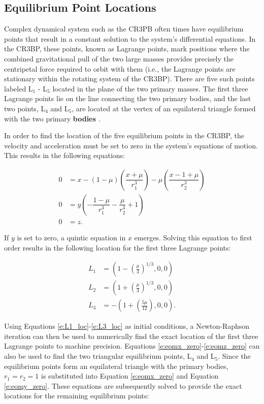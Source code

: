 \documentclass[11pt]{article} %
\begin{document}
\subsection{Equilibrium Point Locations}
Complex dynamical system such as the CR3PB often times have equilibrium points that result in a constant solution to the system's differential equations. In the CR3BP, these points, known as Lagrange points, mark positions where the combined gravitational pull of the two large masses provides precisely the centripetal force required to orbit with them (i.e., the Lagrange points are stationary within the rotating system of the CR3BP). There are five such points labeled L$_1$ - L$_5$ located in the plane of the two primary masses. The first three Lagrange points lie on the line connecting the two primary bodies, and the last two points, L$_4$ and L$_5$, are located at the vertex of an equilateral triangle formed with the two primary \textbf{bodies \cite{KoonLoMarsdenRoss2011}}.

In order to find the location of the five equilibrium points in the CR3BP, the velocity and acceleration must be set to zero in the system's equations of motion. This results in the following equations:

\begin{align}
	0 & = x - (1-\mu)\left(\dfrac{x+\mu}{r_1^3}\right) - \mu\left(\dfrac{x-1+\mu}{r_2^3}\right) \label{e:eomx_zero}\\
	0 & = y\left(-\dfrac{1-\mu}{r_1^3} - \dfrac{\mu}{r_2^3} + 1\right) \label{e:eomy_zero}\\
	0 & = z. \label{e:eomz_zero}
\end{align}

\noindent
If $y$ is set to zero, a quintic equation in $x$ emerges. Solving this equation to first order results in the following location for the first three Lagrange points:

\begin{align}
	L_1 &= \left(1-\left(\frac{\mu}{3}\right)^{1/3},0,0\right)\label{e:L1_loc}\\
	L_2 &= \left(1+\left(\frac{\mu}{3}\right)^{1/3},0,0\right)\label{e:L2_loc}\\
	L_3 &= -\left(1+\left(\frac{5\mu}{12}\right),0,0\right). \label{e:L3_loc}
\end{align}

\noindent
Using Equations \ref{e:L1_loc}-\ref{e:L3_loc} as initial conditions, a Newton-Raphson iteration can then be used to numerically find the exact location of the first three Lagrange points to machine precision. Equations \ref{e:eomx_zero}-\ref{e:eomz_zero} can also be used to find the two triangular equilibrium points, L$_4$ and L$_5$. Since the equilibrium points form an equilateral triangle with the primary bodies, $r_1 = r_2 = 1$ is substituted into Equation \ref{e:eomx_zero} and Equation \ref{e:eomy_zero}. These equations are subsequently solved to provide the exact locations for the remaining equilibrium points:
\end{document}
